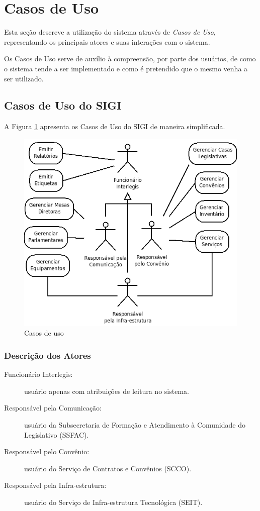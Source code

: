 %
%

\section{Casos de Uso}
\label{sec:casos}

Esta seção descreve a utilização do sistema através de \emph{Casos de
  Uso}, representando os principais atores e suas interações com o
sistema.

Os Casos de Uso serve de auxílio à compreensão, por parte dos
usuários, de como o sistema tende a ser implementado e como é
pretendido que o mesmo venha a ser utilizado.

\subsection{Casos de Uso do SIGI}
A Figura \ref{fig:casos} apresenta os Casos de Uso do SIGI de maneira
simplificada.

\begin{figure}[h]
  \centering
  \includegraphics[width=120mm]{../imagens/casosdeuso.png}
  \caption{Casos de uso}
  \label{fig:casos}
\end{figure}

\subsubsection{Descrição dos Atores}
\begin{description}
\item[Funcionário Interlegis:] usuário apenas com atribuições de
  leitura no sistema.
\item[Responsável pela Comunicação:] usuário da Subsecretaria de
  Formação e Atendimento à Comunidade do Legislativo (SSFAC).
\item[Responsável pelo Convênio:] usuário do Serviço de Contratos e
  Convênios (SCCO).
\item[Responsável pela Infra-estrutura:] usuário do Serviço de
  Infra-estrutura Tecnológica (SEIT).
\end{description}

